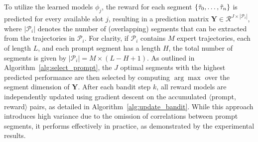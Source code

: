 \documentclass{article} %
\begin{document}
To utilize the learned models $\phi_j$, the reward for each segment $\{ \Tilde{\tau}_0, \dots, \Tilde{\tau}_n \}$ is predicted for every available slot $j$, resulting in a prediction matrix $\mathbf{Y} \in \mathcal{R}^{J \times |\mathcal{P}_i|}$, where $|\mathcal{P}_i|$ denotes the number of (overlapping) segments that can be extracted from the trajectories in $\mathcal{P}_i$. 
For clarity, if $\mathcal{P}_i$ contains $M$ expert trajectories, each of length $L$, and each prompt segment has a length $H$, the total number of segments is given by $|\mathcal{P}_i| = M \times (L - H + 1)$.
As outlined in Algorithm~\ref{alg:select_prompt}, the $J$ optimal segments with the highest predicted performance are then selected by computing $\arg \max$ over the segment dimension of $\mathbf{Y}$.
After each bandit step $k$, all reward models are independently updated using gradient descent on the accumulated $\langle$prompt, reward$\rangle$ pairs, as detailed in Algorithm~\ref{alg:update_bandit}. While this approach introduces high variance due to the omission of correlations between prompt segments, it performs effectively in practice, as demonstrated by the experimental results. %
\end{document}
